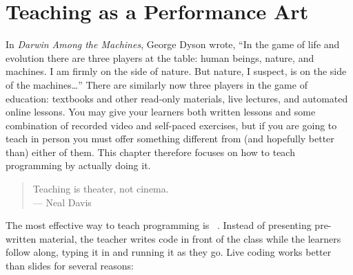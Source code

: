 \chapter{Teaching as a Performance Art}\label{s:performance}

In \emph{Darwin Among the Machines},
George Dyson wrote,
``In the game of life and evolution there are three players at the table:
human beings, nature, and machines.
I am firmly on the side of nature.
But nature, I suspect, is on the  side of the machines{\ldots}''
There are similarly now three players in the game of education:
textbooks and other read-only materials,
live lectures,
and automated online lessons.
You may give your learners both written lessons
and some combination of recorded video and self-paced exercises,
but if you are going to teach in person
you must offer something different from (and hopefully better than) either of them.
This chapter therefore focuses on how to teach programming by actually doing it.


\begin{quote}

  Teaching is theater, not cinema. \\
  --- Neal Davis

\end{quote}

The most effective way to teach programming is ~\cite{Rubi2013,Haar2017,Raj2018}.
Instead of presenting pre-written material,
the teacher writes code in front of the class
while the learners follow along,
typing it in and running it as they go.
Live coding works better than slides for several reasons:

